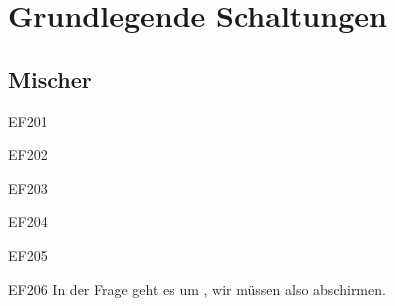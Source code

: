 
\setcounter{section}{7}
\section{Grundlegende Schaltungen}



\setcounter{subsection}{3}
\subsection{Mischer}

\begin{sol}{EF201}
\end{sol}
\begin{sol}{EF202}
\end{sol}
\begin{sol}{EF203}
\end{sol}
\begin{sol}{EF204}
\end{sol}
\begin{sol}{EF205}
\end{sol}
\begin{sol}{EF206}
    In der Frage geht es um , wir müssen also abschirmen.    
\end{sol}


